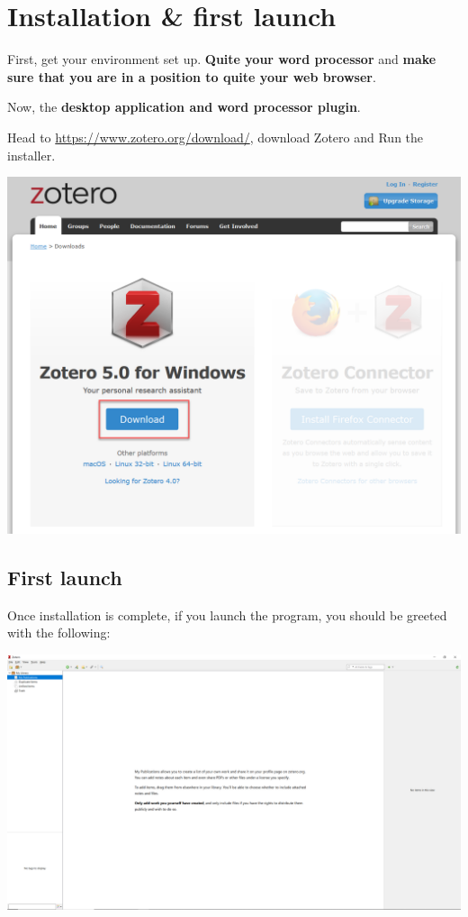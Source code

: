 \documentclass[
]{book}
\begin{document}
\hypertarget{installation-first-launch}{%
\section{Installation \& first launch}\label{installation-first-launch}}

First, get your environment set up. \textbf{Quite your word processor} and \textbf{make sure that you are in a position to quite your web browser}.

Now, the \textbf{desktop application and word processor plugin}.

Head to \url{https://www.zotero.org/download/}, download Zotero and Run the installer.

\includegraphics{images/Z_DownloadZotero.png}

\hypertarget{first-launch}{%
\subsection*{First launch}\label{first-launch}}

Once installation is complete, if you launch the program, you should be greeted with the following:

\includegraphics{images/Z_FirstLaunch.png}
\end{document}
